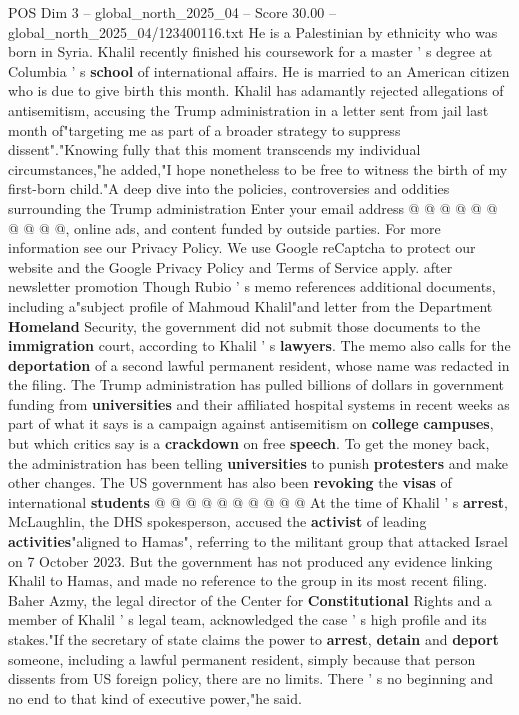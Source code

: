 \begin{textsample}{POS Dim 3 – global\_north\_2025\_04 – Score 30.00 – global\_north\_2025\_04/123400116.txt}
He is a Palestinian by ethnicity who was born in Syria.
Khalil recently finished his coursework for a master ' s degree at Columbia ' s \textbf{school} of international affairs.
He is married to an American citizen who is due to give birth this month.
Khalil has adamantly rejected allegations of antisemitism, accusing the Trump administration in a letter sent from jail last month of"targeting me as part of a broader strategy to suppress dissent"."Knowing fully that this moment transcends my individual circumstances,"he added,"I hope nonetheless to be free to witness the birth of my first-born child."A deep dive into the policies, controversies and oddities surrounding the Trump administration Enter your email address @ @ @ @ @ @ @ @ @ @, online ads, and content funded by outside parties.
For more information see our Privacy Policy.
We use Google reCaptcha to protect our website and the Google Privacy Policy and Terms of Service apply. after newsletter promotion Though Rubio ' s memo references additional documents, including a"subject profile of Mahmoud Khalil"and letter from the Department \textbf{Homeland} Security, the government did not submit those documents to the \textbf{immigration} court, according to Khalil ' s \textbf{lawyers}.
The memo also calls for the \textbf{deportation} of a second lawful permanent resident, whose name was redacted in the filing.
The Trump administration has pulled billions of dollars in government funding from \textbf{universities} and their affiliated hospital systems in recent weeks as part of what it says is a campaign against antisemitism on \textbf{college} \textbf{campuses}, but which critics say is a \textbf{crackdown} on free \textbf{speech}.
To get the money back, the administration has been telling \textbf{universities} to punish \textbf{protesters} and make other changes.
The US government has also been \textbf{revoking} the \textbf{visas} of international \textbf{students} @ @ @ @ @ @ @ @ @ @ At the time of Khalil ' s \textbf{arrest}, McLaughlin, the DHS spokesperson, accused the \textbf{activist} of leading \textbf{activities}"aligned to Hamas", referring to the militant group that attacked Israel on 7 October 2023.
But the government has not produced any evidence linking Khalil to Hamas, and made no reference to the group in its most recent filing.
Baher Azmy, the legal director of the Center for \textbf{Constitutional} Rights and a member of Khalil ' s legal team, acknowledged the case ' s high profile and its stakes."If the secretary of state claims the power to \textbf{arrest}, \textbf{detain} and \textbf{deport} someone, including a lawful permanent resident, simply because that person dissents from US foreign policy, there are no limits.
There ' s no beginning and no end to that kind of executive power,"he said.

\end{textsample}
